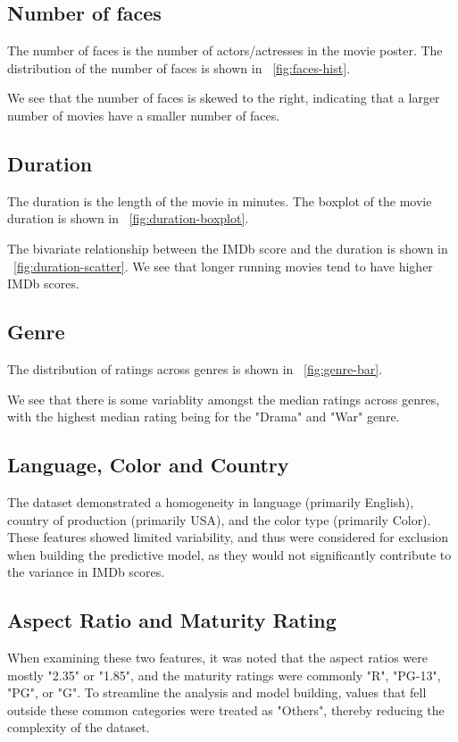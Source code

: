 \documentclass[12pt,a4paper]{article}
\begin{document}
\subsection{Number of faces}\label{subsec:number-of-faces}
The number of faces is the number of actors/actresses in the movie poster.
The distribution of the number of faces is shown in \figurename~\ref{fig:faces-hist}.

We see that the number of faces is skewed to the right, indicating that a larger number of movies have a smaller number of faces.

\subsection{Duration}\label{subsec:duration}
The duration is the length of the movie in minutes.
The boxplot of the movie duration is shown in \figurename~\ref{fig:duration-boxplot}.

The bivariate relationship between the IMDb score and the duration is shown in \figurename~\ref{fig:duration-scatter}.
We see that longer running movies tend to have higher IMDb scores.

\subsection{Genre}\label{subsec:genre}
The distribution of ratings across genres is shown in \figurename~\ref{fig:genre-bar}.

We see that there is some variablity amongst the median ratings across genres, with the highest median rating being for the "Drama" and "War" genre.

\subsection{Language, Color and Country}\label{subsec:language}
The dataset demonstrated a homogeneity in language (primarily English), country of production (primarily USA), and the color type (primarily Color).
These features showed limited variability, and thus were considered for exclusion when building the predictive model, as they would not significantly contribute to the variance in IMDb scores.

\subsection{Aspect Ratio and Maturity Rating}\label{subsec:aspect-ratio}
When examining these two features, it was noted that the aspect ratios were mostly "2.35" or "1.85", and the maturity ratings were commonly "R", "PG-13", "PG", or "G".
To streamline the analysis and model building, values that fell outside these common categories were treated as "Others", thereby reducing the complexity of the dataset.
\end{document}
